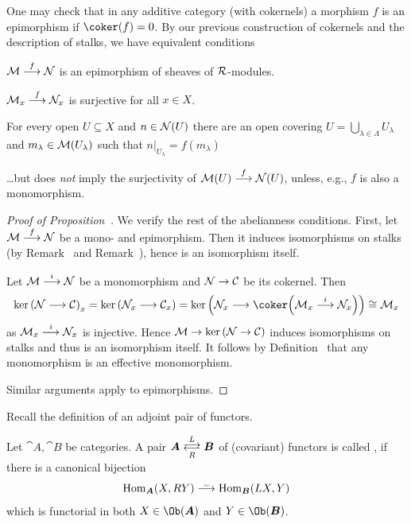 \documentclass[a4paper,parskip=half,numbers=enddot, DIV=12]{scrreprt}
\begin{document}
\begin{rem}
	One may check that in any additive category (with cokernels) a morphism $f$ is an epimorphism if $\coker(f)=0$. By our previous construction of cokernels and the description of stalks, we have equivalent conditions
	\begin{alphanumerate}
		\item $\Mm\morphism[f]\Nn$ is an epimorphism of sheaves of $\mathcal{R}$-modules.
		\item $\Mm_x\morphism[f]\Nn_x$ is surjective for all $x\in X$.
		\item For every open $U\subseteq X$ and $n\in\mathcal{N}(U)$ there are an open covering $U=\bigcup_{\lambda\in\Lambda}U_\lambda$ and $m_\lambda\in\mathcal{M}(U_\lambda)$ such that $n|_{U_\lambda}=f(m_\lambda)$
	\end{alphanumerate}
	\ldots but  does \emph{not} imply the surjectivity of $\Mm(U)\morphism[f]\Nn(U)$, unless, e.g., $f$ is also a monomorphism.
\end{rem}
\begin{proof}[Proof of Proposition~]
	We verify the rest of the abelianness conditions. First, let $\Mm\morphism[f]\Nn$ be a mono- and epimorphism. Then it induces isomorphisms on stalks (by Remark~ and Remark~), hence is an isomorphism itself.
	
	Let $\Mm\morphism[i]\Nn$ be a monomorphism and $\Nn\morphism\Cc$ be its cokernel. Then 
	\begin{align*}
		\ker\left(\Nn\morphism\Cc\right)_x=\ker\left(\Nn_x\morphism\Cc_x\right)=\ker\left(\Nn_x\morphism\coker\Big(\Mm_x\morphism[i]\Nn_x\Big)\right)\cong\Mm_x
	\end{align*}
	as $\Mm_x\morphism[i]\Nn_x$ is injective. Hence $\Mm\morphism\ker\left(\Nn\morphism\Cc\right)$ induces isomorphisms on stalks and thus is an isomorphism itself. It follows by Definition~ that any monomorphism is an effective monomorphism.
	
	Similar arguments apply to epimorphisms.	
\end{proof}
Recall the definition of an adjoint pair of functors.
\begin{defi}
	Let ${\cat A},{\cat B}$ be categories. A pair ${\cat A}\doublelrmorphism[L][\smash{R}]{\cat B}$ of (covariant) functors is called , if there is a canonical bijection
	\begin{align*}
		\Hom_{\cat A}(X,RY)\isomorphism\Hom_{\cat B}(LX,Y)
	\end{align*}
	which is functorial in both $X\in\Ob({\cat A})$ and $Y\in\Ob({\cat B})$.
\end{defi}
\end{document}
